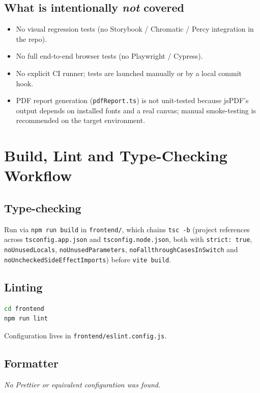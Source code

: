 \documentclass[11pt,a4paper]{article}
\begin{document}
\subsection{What is intentionally \emph{not} covered}
\begin{itemize}[leftmargin=1.6em]
  \item No visual regression tests (no Storybook / Chromatic / Percy
        integration in the repo).
  \item No full end-to-end browser tests (no Playwright / Cypress).
  \item No explicit CI runner; tests are launched manually or by a local
        commit hook.
  \item PDF report generation (\texttt{pdfReport.ts}) is not unit-tested
        because jsPDF's output depends on installed fonts and a real canvas;
        manual smoke-testing is recommended on the target environment.
\end{itemize}

\section{Build, Lint and Type-Checking Workflow}
\label{sec:qa}

\subsection{Type-checking}
Run via \texttt{npm run build} in \texttt{frontend/}, which chains
\texttt{tsc -b} (project references across \texttt{tsconfig.app.json} and
\texttt{tsconfig.node.json}, both with \texttt{strict: true},
\texttt{noUnusedLocals}, \texttt{noUnusedParameters},
\texttt{noFallthroughCasesInSwitch} and \texttt{noUncheckedSideEffectImports})
before \texttt{vite build}.

\subsection{Linting}
\begin{lstlisting}[language=bash]
cd frontend
npm run lint
\end{lstlisting}
Configuration lives in \texttt{frontend/eslint.config.js}.

\subsection{Formatter}
\emph{No Prettier or equivalent configuration was found.}
\end{document}
